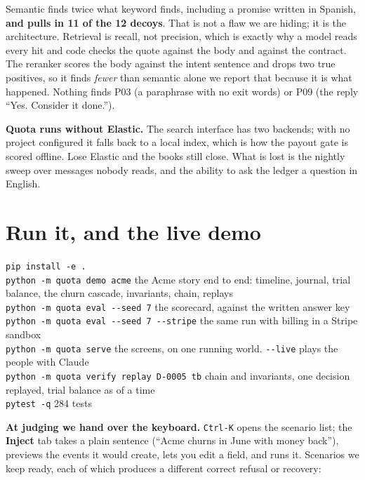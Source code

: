 \documentclass[10pt,a4paper]{article}
\newcommand{\gy}[1]{{\color{qgrey}#1}}
\newcommand{\code}[1]{{\small\texttt{#1}}}
\begin{document}
\vspace{4pt}
Semantic finds twice what keyword finds, including a promise written in Spanish, \textbf{and pulls in 11 of the 12 decoys}. That is not a flaw we are hiding; it is the architecture. Retrieval is recall, not precision, which is exactly why a model reads every hit and code checks the quote against the body and against the contract. The reranker scores the body against the intent sentence and drops two true positives, so it finds \emph{fewer} than semantic alone \textemdash{} we report that because it is what happened. Nothing finds P03 \gy{(a paraphrase with no exit words)} or P09 \gy{(the reply ``Yes. Consider it done.'')}.

\textbf{Quota runs without Elastic.} The search interface has two backends; with no project configured it falls back to a local index, which is how the payout gate is scored offline. Lose Elastic and the books still close. What is lost is the nightly sweep over messages nobody reads, and the ability to ask the ledger a question in English.

\section{Run it, and the live demo}

\begin{callout}
\small
\code{pip install -e .}\\
\code{python -m quota demo acme} \gy{\textemdash{} the Acme story end to end: timeline, journal, trial balance, the churn cascade, invariants, chain, replays}\\
\code{python -m quota eval -{}-seed 7} \gy{\textemdash{} the scorecard, against the written answer key}\\
\code{python -m quota eval -{}-seed 7 -{}-stripe} \gy{\textemdash{} the same run with billing in a Stripe sandbox}\\
\code{python -m quota serve} \gy{\textemdash{} the screens, on one running world. \code{-{}-live} plays the people with Claude}\\
\code{python -m quota verify \textbar{} replay D-0005 \textbar{} tb} \gy{\textemdash{} chain and invariants, one decision replayed, trial balance as of a time}\\
\code{pytest -q} \gy{\textemdash{} 284 tests}
\end{callout}

\textbf{At judging we hand over the keyboard.} \code{Ctrl-K} opens the scenario list; the \textbf{Inject} tab takes a plain sentence \gy{(``Acme churns in June with money back'')}, previews the events it would create, lets you edit a field, and runs it. Scenarios we keep ready, each of which produces a different correct refusal or recovery:
\end{document}
